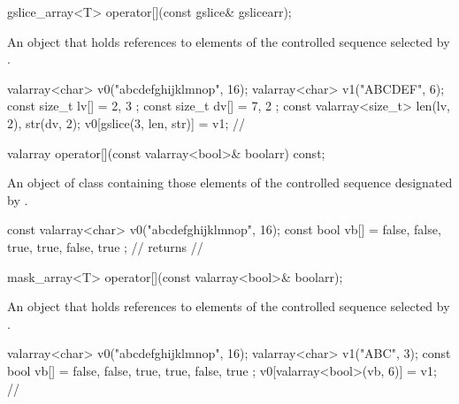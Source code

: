 %
\begin{itemdecl}
gslice_array<T> operator[](const gslice& gslicearr);
\end{itemdecl}

\begin{itemdescr}
\pnum
\returns An object that holds references to elements of the controlled
sequence selected by . \begin{example}
\begin{codeblock}
valarray<char> v0("abcdefghijklmnop", 16);
valarray<char> v1("ABCDEF", 6);
const size_t lv[] = { 2, 3 };
const size_t dv[] = { 7, 2 };
const valarray<size_t> len(lv, 2), str(dv, 2);
v0[gslice(3, len, str)] = v1;
// 
\end{codeblock}
\end{example}
\end{itemdescr}

%
\begin{itemdecl}
valarray operator[](const valarray<bool>& boolarr) const;
\end{itemdecl}

\begin{itemdescr}
\pnum
\returns An object of class  containing those
elements of the controlled sequence designated by .
\begin{example}
\begin{codeblock}
const valarray<char> v0("abcdefghijklmnop", 16);
const bool vb[] = { false, false, true, true, false, true };
//  returns
// 
\end{codeblock}
\end{example}
\end{itemdescr}

%
\begin{itemdecl}
mask_array<T> operator[](const valarray<bool>& boolarr);
\end{itemdecl}

\begin{itemdescr}
\pnum
\returns An object that holds references to elements of the controlled
sequence selected by . \begin{example}
\begin{codeblock}
valarray<char> v0("abcdefghijklmnop", 16);
valarray<char> v1("ABC", 3);
const bool vb[] = { false, false, true, true, false, true };
v0[valarray<bool>(vb, 6)] = v1;
// 
\end{codeblock}
\end{example}
\end{itemdescr}

